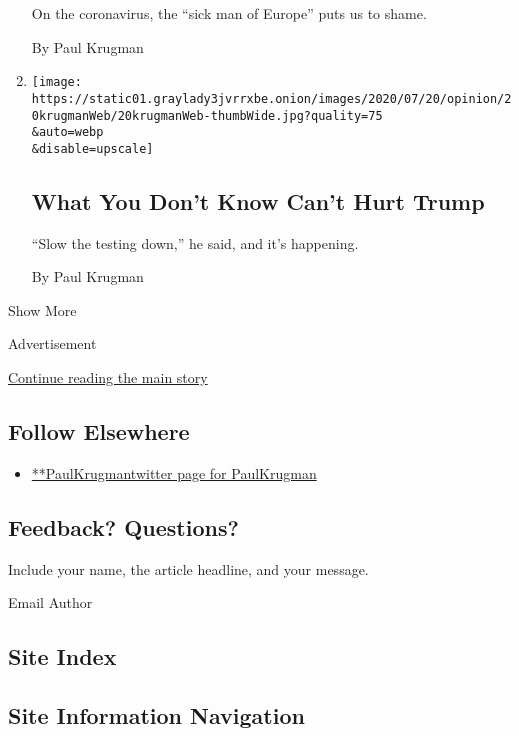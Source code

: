 \begin{enumerate}
  On the coronavirus, the ``sick man of Europe'' puts us to shame.

  By Paul Krugman
\item
  \href{/2020/07/20/opinion/trump-coronavirus-testing.html}{}

  \texttt{[image: https://static01.graylady3jvrrxbe.onion/images/2020/07/20/opinion/20krugmanWeb/20krugmanWeb-thumbWide.jpg?quality=75\\\&auto=webp\\\&disable=upscale]}

  \hypertarget{what-you-dont-know-cant-hurt-trump}{%
  \subsection{What You Don't Know Can't Hurt
  Trump}\label{what-you-dont-know-cant-hurt-trump}}

  ``Slow the testing down,'' he said, and it's happening.

  By Paul Krugman
\end{enumerate}

Show More

Advertisement

\protect\hyperlink{after-mid2}{Continue reading the main story}

\hypertarget{follow-elsewhere}{%
\subsection{Follow Elsewhere}\label{follow-elsewhere}}

\begin{itemize}
\tightlist
\item
  \href{https://twitter.com/PaulKrugman}{**PaulKrugmantwitter page for
  PaulKrugman}
\end{itemize}

\hypertarget{feedback-questions}{%
\subsection{Feedback? Questions?}\label{feedback-questions}}

Include your name, the article headline, and your message.

Email Author

\hypertarget{site-index}{%
\subsection{Site Index}\label{site-index}}

\hypertarget{site-information-navigation}{%
\subsection{Site Information
Navigation}\label{site-information-navigation}}

